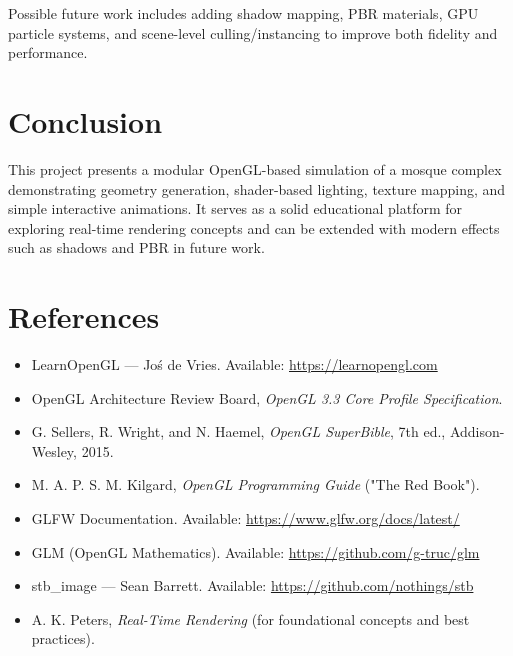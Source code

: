 \documentclass[a4paper,12pt]{extarticle}
\begin{document}
Possible future work includes adding shadow mapping, PBR materials, GPU particle systems, and scene-level culling/instancing to improve both fidelity and performance.

\section{Conclusion}
This project presents a modular OpenGL-based simulation of a mosque complex demonstrating geometry generation, shader-based lighting, texture mapping, and simple interactive animations. It serves as a solid educational platform for exploring real-time rendering concepts and can be extended with modern effects such as shadows and PBR in future work.

\FloatBarrier   %

\section{References}
\begin{itemize}
    \item LearnOpenGL — Jo\'s de Vries. Available: \url{https://learnopengl.com}
    \item OpenGL Architecture Review Board, \textit{OpenGL 3.3 Core Profile Specification}.
    \item G. Sellers, R. Wright, and N. Haemel, \textit{OpenGL SuperBible}, 7th ed., Addison-Wesley, 2015.
    \item M. A. P. S. M. Kilgard, \textit{OpenGL Programming Guide} ("The Red Book").
    \item GLFW Documentation. Available: \url{https://www.glfw.org/docs/latest/}
    \item GLM (OpenGL Mathematics). Available: \url{https://github.com/g-truc/glm}
    \item stb\_image — Sean Barrett. Available: \url{https://github.com/nothings/stb}
    \item A. K. Peters, \textit{Real-Time Rendering} (for foundational concepts and best practices).
\end{itemize}
\end{document}
